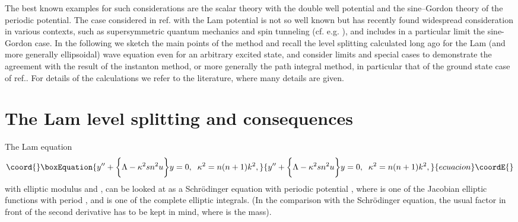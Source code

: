 \documentclass[a4paper,12pt,a4]{article}
\begin{document}
The best known examples
for such considerations are the scalar theory with the double well
potential and the
sine--Gordon theory of the periodic potential.  The case considered
in ref.\cite{1} with the Lam\coordHE{} potential
 is not so well known but has recently found
widespread consideration in various contexts, such as
supersymmetric quantum mechanics \cite{5}
and spin tunneling (cf. e.g. \cite{6}), and includes in a particular limit
the sine-Gordon case.  In the following
 we sketch the main points of the method and 
recall the level splitting calculated long ago for the
Lam\coordHE{} (and more generally ellipsoidal) wave
equation \cite{7} even for an arbitrary
excited state,  and consider limits and special cases to
demonstrate the agreement with the result of the
instanton method, or more generally the
path integral method,  in particular that 
of the ground state case of ref.\cite{1}.
For details of the calculations we refer to the
literature, where many details are given.












\section{The Lam\coordHE{} level splitting and consequences}
The Lam\coordHE{} equation \cite{8}
\begin{equation}\coord{}\boxEquation{
y^{\prime\prime}+\bigg\{\Lambda -\kappa^2 sn^2u\bigg\}y=0, \;\; \kappa^2
=n(n+1)k^2,
\label{1}
}{
y^{\prime\prime}+\bigg\{\Lambda -\kappa^2 sn^2u\bigg\}y=0, \;\; \kappa^2
=n(n+1)k^2,
}{ecuacion}\coordE{}\end{equation}
with elliptic modulus \coordHE{} and \coordHE{}, can be
looked at as a Schr\"odinger equation with periodic potential
\coordHE{}, where \coordHE{} is one of the Jacobian elliptic functions
with period \coordHE{}, and \coordHE{} is one of the complete
elliptic integrals. (In the comparison with the Schr\"odinger
equation, the usual factor \coordHE{} in front of the second
derivative has to be kept in mind, where \coordHE{} is the mass).
\end{document}
